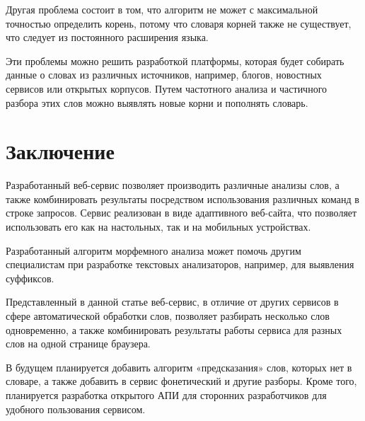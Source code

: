 \documentclass[a4paper,12pt]{article}
\begin{document}
Другая проблема состоит в том, что алгоритм не может с максимальной точностью определить корень, потому что словаря корней также не существует, что следует из постоянного расширения языка.

Эти проблемы можно решить разработкой платформы, которая будет собирать данные о словах из различных источников, например, блогов, новостных сервисов или открытых корпусов. Путем частотного анализа и частичного разбора этих слов можно выявлять новые корни и пополнять словарь.

\section*{Заключение}
Разработанный веб-сервис позволяет производить различные анализы слов, а также комбинировать результаты посредством использования различных команд в строке запросов. Сервис реализован в виде адаптивного веб-сайта, что позволяет использовать его как на настольных, так и на мобильных устройствах.

Разработанный алгоритм морфемного анализа может помочь другим специалистам при разработке текстовых анализаторов, например, для выявления суффиксов.

Представленный в данной статье веб-сервис, в отличие от других сервисов в сфере автоматической обработки слов, позволяет разбирать несколько слов одновременно, а также комбинировать результаты работы сервиса для разных слов на одной странице браузера.

В будущем планируется добавить алгоритм «предсказания» слов, которых нет в словаре, а также добавить в сервис фонетический и другие разборы. Кроме того, планируется разработка открытого АПИ для сторонних разработчиков для удобного пользования сервисом.


\printbibliography[title={Список использованных источников}]
\end{document}
